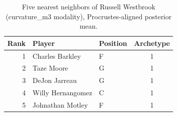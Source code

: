 \begin{table}[htbp]
  \centering\small
  \begin{tabular}{rllc}
    \toprule
    Rank & Player & Position & Archetype \\
    \midrule
    1 & Charles Barkley & F & 1 \\
    2 & Taze Moore & G & 1 \\
    3 & DeJon Jarreau & G & 1 \\
    4 & Willy Hernangomez & C & 1 \\
    5 & Johnathan Motley & F & 1 \\
    \bottomrule
  \end{tabular}
  \caption{Five nearest neighbors of Russell Westbrook (curvature_m3 modality), Procrustes-aligned posterior mean.}
  \label{tab:Russell_Westbrook_neighbors_curvature_m3}
\end{table}

